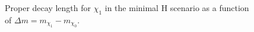 \documentclass[a4paper,11pt]{article}
\begin{document}
\begin{figure}
	\centering
	\caption{Proper decay length for $\chi_1$ in the minimal H scenario as a function of $\Delta m = m_{\chi_1} - m_{\chi_0}$.} \label{fig:chi1_lifetimeH}
\end{figure}


%
%
\end{document}
